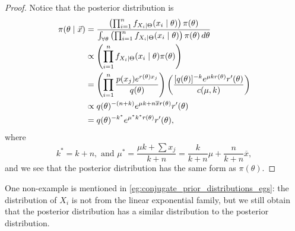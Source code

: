 \documentclass[notoc,notitlepage]{tufte-book}
\begin{document}
\begin{proof}
  Notice that the posterior distribution is
  \begin{align*}
    \pi(\theta \mid \vec{x})
    &= \frac{\left( \prod_{i=1}^{n} f_{X_i \mid \Theta}(x_i \mid \theta) \right)
      \pi(\theta)}{\int_{\forall \theta} \left( \prod_{i=1}^{n} f_{X_i \mid
      \Theta}(x_i \mid \theta) \right) \pi(\theta) \mathop{}\!d{\theta}} \\
    &\propto \left( \prod_{i=1}^{n} f_{X_i \mid \Theta}(x_i \mid \theta)
      \pi(\theta) \right) \\
    &= \left( \prod_{i=1}^{n} \frac{p(x_j)e^{r(\theta) x_j}}{q(\theta)} \right)
      \left( \frac{[q(\theta)]^{-k} e^{\mu kr(\theta)} r'(\theta)}{c(\mu, k)}
      \right) \\
    &\propto q(\theta)^{-(n+k)} e^{\mu k + n \overline{x} r(\theta)} r'(\theta)
    \\
    &= q(\theta)^{-k^*} e^{\mu^* k^* r(\theta)} r'(\theta),
  \end{align*}
  where
  \begin{equation*}
    k^* = k + n, \text{ and } \mu^* = \frac{\mu k + \sum x_j}{k + n} =
    \frac{k}{k + n} \mu + \frac{n}{k + n} \overline{x},
  \end{equation*}
  and we see that the posterior distribution has the same form as
  $\pi(\theta)$.
\end{proof}

\begin{eg}
  One non-example is mentioned in \cref{eg:conjugate_prior_distributions_egs}:
  the distribution of $X_i$ is not from the linear exponential family, but we
  still obtain that the posterior distribution has a similar distribution to the
  posterior distribution.
\end{eg}




\appendix

\backmatter

\fancyhead[LE]{\thepage \enspace \textsl{\leftmark}}



\printindex
\end{document}
